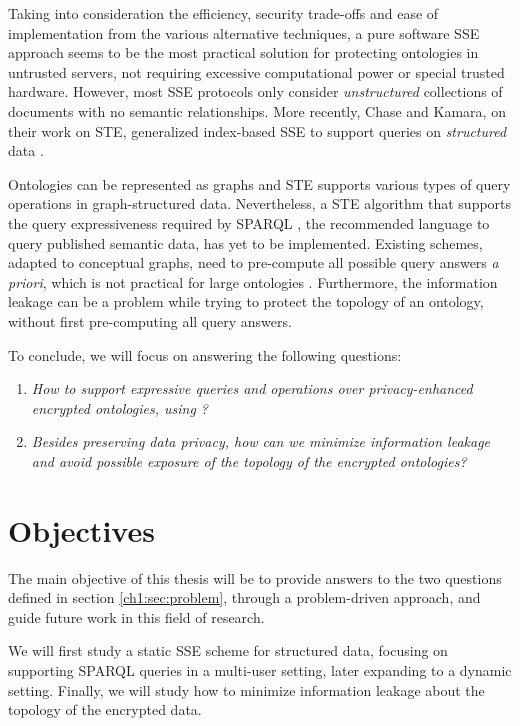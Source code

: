 Taking into consideration the efficiency, security trade-offs and ease of implementation from the various alternative techniques, a pure software \gls{SSE} approach seems to be the most practical solution for protecting ontologies in untrusted servers, not requiring excessive computational power or special trusted hardware. However, most \gls{SSE} protocols only consider \emph{unstructured} collections of documents with no semantic relationships. More recently, Chase and Kamara, on their work on \gls{STE}, generalized index-based \gls{SSE} to support queries on \emph{structured} data \autocite{Chase2010-xx}.

Ontologies can be represented as graphs and \gls{STE} supports various types of query operations in graph-structured data. Nevertheless, a \gls{STE} algorithm that supports the query expressiveness required by \gls{SPARQL} \autocite{W3c2008-vf, W3c2013-hd}, the recommended language to query published semantic data, has yet to be implemented. Existing schemes, adapted to conceptual graphs, need to pre-compute all possible query answers \emph{a priori}, which is not practical for large ontologies \autocite{Poh2012-qs}. Furthermore, the information leakage can be a problem while trying to protect the topology of an ontology, without first pre-computing all query answers.

To conclude, we will focus on answering the following questions:

\begin{enumerate}
    \item \emph{How to support expressive queries and operations over privacy-enhanced encrypted ontologies, using ?}
    \item \emph{Besides preserving data privacy, how can we minimize information leakage and avoid possible exposure of the topology of the encrypted ontologies?}
\end{enumerate}

\section{Objectives}
\label{ch1:sec:objectives}

The main objective of this thesis will be to provide answers to the two questions defined in section \ref{ch1:sec:problem}, through a problem-driven approach, and guide future work in this field of research.

We will first study a static \gls{SSE} scheme for structured data, focusing on supporting \gls{SPARQL} queries in a multi-user setting, later expanding to a dynamic setting. Finally, we will study how to minimize information leakage about the topology of the encrypted data.



